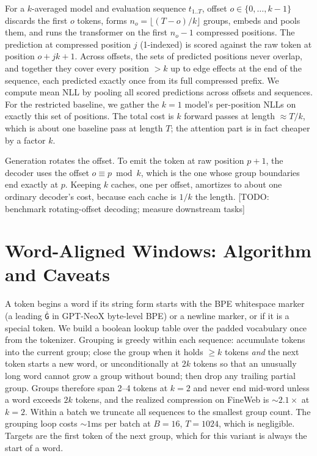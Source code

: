 \documentclass[11pt]{article}
\newcommand{\todo}[1]{\textcolor{warnred}{[TODO: #1]}}
\begin{document}
For a $k$-averaged model and evaluation sequence $t_{1..T}$, offset $o \in
\{0, \dots, k{-}1\}$ discards the first $o$ tokens, forms $n_o = \lfloor
(T-o)/k \rfloor$ groups, embeds and pools them, and runs the transformer on the
first $n_o - 1$ compressed positions. The prediction at compressed position $j$
(1-indexed) is scored against the raw token at position $o + jk + 1$. Across
offsets, the sets of predicted positions never overlap, and together they cover
every position $> k$ up to edge effects at the end of the sequence, each
predicted exactly once from its full compressed prefix. We compute mean NLL by
pooling all scored predictions across offsets and sequences. For the restricted
baseline, we gather the $k{=}1$ model's per-position NLLs on exactly this set of
positions. The total cost is $k$ forward passes at length $\approx T/k$, which
is about one baseline pass at length $T$; the attention part is in fact cheaper
by a factor $k$.

Generation rotates the offset. To emit the token at raw position $p{+}1$, the
decoder uses the offset $o \equiv p \bmod k$, which is the one whose group
boundaries end exactly at $p$. Keeping $k$ caches, one per offset, amortizes to
about one ordinary decoder's cost, because each cache is $1/k$ the length.
\todo{benchmark rotating-offset decoding; measure downstream tasks}

\section{Word-Aligned Windows: Algorithm and Caveats}
\label{app:word}

A token begins a word if its string form starts with the BPE whitespace marker
(a leading \texttt{\.{G}} in GPT-NeoX byte-level BPE) or a newline marker, or if
it is a special token. We build a boolean lookup table over the padded
vocabulary once from the tokenizer. Grouping is greedy within each sequence:
accumulate tokens into the current group; close the group when it holds $\geq k$
tokens \emph{and} the next token starts a new word, or unconditionally at $2k$
tokens so that an unusually long word cannot grow a group without bound; then
drop any trailing partial group. Groups therefore span 2--4 tokens at $k{=}2$
and never end mid-word unless a word exceeds $2k$ tokens, and the realized
compression on FineWeb is ${\sim}2.1\times$ at $k{=}2$. Within a batch we
truncate all sequences to the smallest group count. The grouping loop costs
${\sim}1$ms per batch at $B{=}16$, $T{=}1024$, which is negligible. Targets are
the first token of the next group, which for this variant is always the start of
a word.
\end{document}

